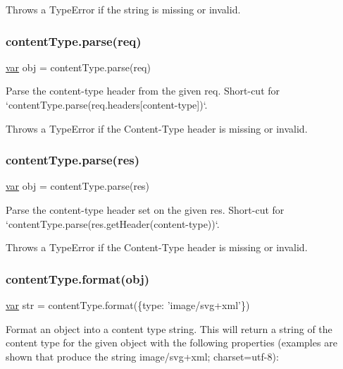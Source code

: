 Throws a {\ttfamily Type\+Error} if the string is missing or invalid.

\subsubsection*{content\+Type.\+parse(req)}


\begin{DoxyCode}
\hyperlink{018__def_8c_a335628f2e9085305224b4f9cc6e95ed5}{var} obj = contentType.parse(req)
\end{DoxyCode}


Parse the {\ttfamily content-\/type} header from the given {\ttfamily req}. Short-\/cut for `content\+Type.parse(req.\+headers\mbox{[}\textquotesingle{}content-\/type\textquotesingle{}\mbox{]})`.

Throws a {\ttfamily Type\+Error} if the {\ttfamily Content-\/\+Type} header is missing or invalid.

\subsubsection*{content\+Type.\+parse(res)}


\begin{DoxyCode}
\hyperlink{018__def_8c_a335628f2e9085305224b4f9cc6e95ed5}{var} obj = contentType.parse(res)
\end{DoxyCode}


Parse the {\ttfamily content-\/type} header set on the given {\ttfamily res}. Short-\/cut for `content\+Type.parse(res.\+get\+Header(\textquotesingle{}content-\/type\textquotesingle{}))`.

Throws a {\ttfamily Type\+Error} if the {\ttfamily Content-\/\+Type} header is missing or invalid.

\subsubsection*{content\+Type.\+format(obj)}


\begin{DoxyCode}
\hyperlink{018__def_8c_a335628f2e9085305224b4f9cc6e95ed5}{var} str = contentType.format(\{type: \textcolor{stringliteral}{'image/svg+xml'}\})
\end{DoxyCode}


Format an object into a content type string. This will return a string of the content type for the given object with the following properties (examples are shown that produce the string {\ttfamily \textquotesingle{}image/svg+xml; charset=utf-\/8\textquotesingle{}})\+:


